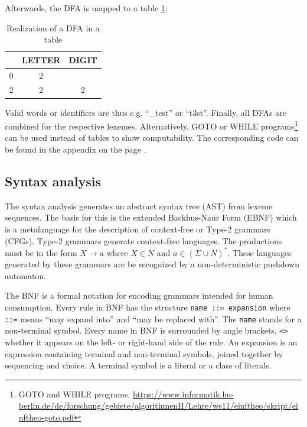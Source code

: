 Afterwards, the DFA is mapped to a table \ref{tab:dfa_table}:

\begin{table}[bth]
	\centering
	\caption{Realization of a DFA in a table}
	\label{tab:dfa_table}
	\begin{tabular}{ | c | c | c | }
		\hline
		~ & \textbf{LETTER} & \textbf{DIGIT} \\ \hline
		0 & 2 & ~ \\ \hline
		2 & 2 & 2 \\ \hline
	\end{tabular}
\end{table}
\noindent

Valid words or identifiers are thus e.g. ``\_test'' or ``t3st''. Finally, all DFAs are combined for the respective lexemes. Alternatively, GOTO or WHILE programs\footnote{GOTO and WHILE programs, \url{https://www.informatik.hu-berlin.de/de/forschung/gebiete/algorithmenII/Lehre/ws11/einftheo/skript/einftheo-goto.pdf}} can be used instead of tables to show computability. The corresponding code can be found in the appendix on the page \pageref{sec:lexer}.

\subsection{Syntax analysis}
\label{sec:syntactic_analysis}

The syntax analysis generates an abstract syntax tree (AST) from lexeme sequences. The basis for this is the extended Backhus-Naur Form (EBNF) which is a metalanguage for the description of context-free or Type-2 grammars (CFGs). Type-2 grammars generate context-free languages. The productions must be in the form $X \rightarrow a$ where $X \in N$ and $a \in (\Sigma \cup N)^*$. These languages generated by these grammars are be recognized by a non-deterministic pushdown automaton.

\begin{defi}[BNF]
	The BNF is a formal notation for encoding grammars intended for human consumption. Every rule in BNF has the structure \texttt{name ::= expansion} where \texttt{::=} means ``may expand into'' and ``may be replaced with''. The \texttt{name} stands for a non-terminal symbol. Every name in BNF is surrounded by angle brackets, \texttt{<>} whether it appears on the left- or right-hand side of the rule. An expansion is an expression containing terminal and non-terminal symbols, joined together by sequencing and choice. A terminal symbol is a literal or a class of literals.
\end{defi}


